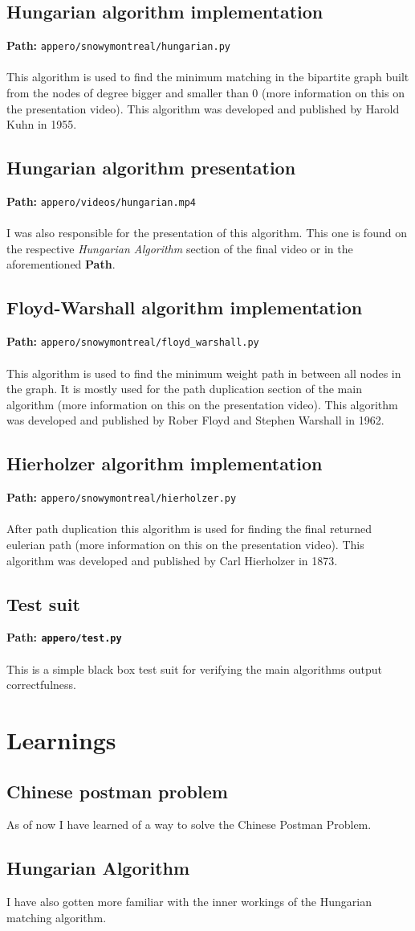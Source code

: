 \documentclass[11pt]{article}
\begin{document}
\subsection{Hungarian algorithm implementation}
\textbf{Path:} \texttt{appero/snowymontreal/hungarian.py}\\\\
This algorithm is used to find the minimum matching in the bipartite graph built
from the nodes of degree bigger and smaller than 0 (more information on this on
the presentation video). This algorithm was developed and published by Harold
Kuhn in 1955.
\subsection{Hungarian algorithm presentation}
\textbf{Path:} \texttt{appero/videos/hungarian.mp4}\\\\
I was also responsible for the presentation of this algorithm. This one is found
on the respective \textit{Hungarian Algorithm} section of the final video or in
the aforementioned \textbf{Path}.
\subsection{Floyd-Warshall algorithm implementation}
\textbf{Path:} \texttt{appero/snowymontreal/floyd\_warshall.py}\\\\
This algorithm is used to find the minimum weight path in between all nodes in
the graph. It is mostly used for the path duplication section of the main
algorithm (more information on this on the presentation video). This algorithm
was developed and published by Rober Floyd and Stephen Warshall in 1962.
\subsection{Hierholzer algorithm implementation}
\textbf{Path:} \texttt{appero/snowymontreal/hierholzer.py}\\\\
After path duplication this algorithm is used for finding the final returned
eulerian path (more information on this on the presentation video). This
algorithm was developed and published by Carl Hierholzer in 1873.
\subsection{Test suit}
\textbf{Path: \texttt{appero/test.py}}\\\\
This is a simple black box test suit for verifying the main algorithms output
correctfulness.
\section{Learnings}
\subsection{Chinese postman problem}
As of now I have learned of a way to solve the Chinese Postman Problem.
\subsection{Hungarian Algorithm}
I have also gotten more familiar with the inner workings of the Hungarian
matching algorithm.
\end{document}
